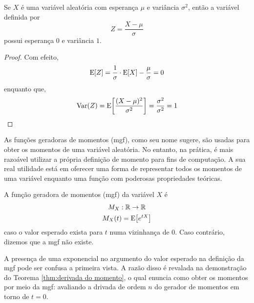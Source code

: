 \begin{prop:padronizacao}
\label{prop:padronizacao}
Se $X$ é uma variável aleatória com esperança $\mu$ e variância $\sigma^2$, então
a variável definida por
\[
    Z = \frac{X - \mu}{\sigma}
\]
possui esperança 0 e variância $1$.
\end{prop:padronizacao}
\begin{proof}
	Com efeito,
	\[
	    \mathrm{E}\!\left[Z\right] = \frac{1}{\sigma} \cdot \mathrm{E}\!\left[X\right] - \frac{\mu}{\sigma} = 0
	\]
	enquanto que,
	\[
	    \mathrm{Var}\!\left(Z\right) = \mathrm{E}\!\left[\frac{(X - \mu)^2}{\sigma^2}\right] = \frac{\sigma^2}{\sigma^2} = 1
	\]
\end{proof}

As funções geradoras de momentos (mgf), como seu nome sugere, são usadas para obter os
momentos de uma variável aleatória.
No entanto, na prática, é mais razoável utilizar a própria definição de momento para fins
de computação.
A sua real utilidade está em oferecer uma forma de representar todos os momentos de uma
variável enquanto uma função com poderosas propriedades teóricas.

\begin{def:mgf}
A função geradora de momentos (mgf) da variável $X$ é
\begin{gather*}
	M_X: \mathbb{R} \to \mathbb{R} \\
	M_X(t) = \mathrm{E}\!\left[e^{tX}\right]
\end{gather*}
caso o valor esperado exista para $t$ numa vizinhança de $0$.
Caso contrário, dizemos que a mgf não existe.
\end{def:mgf}

A presença de uma exponencial no argumento do valor esperado na definição da mgf pode
ser confusa a primeira vista.
A razão disso é revalada na demonstração do Teorema \ref{thm:derivada do momento}, o qual
enuncia como obter os momentos por meio da mgf: avaliando a drivada de ordem $n$ do
gerador de momentos em torno de $t = 0$.

